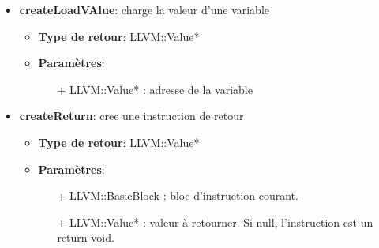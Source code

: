 \documentclass{article}
\begin{document}
\begin{enumerate}
\begin{itemize}
  \item \textbf{createLoadVAlue}: charge la valeur d'une variable
  \begin{itemize}
    \item \textbf{Type de retour}: LLVM::Value*
    \item \textbf{Paramètres}:
    \begin{enumerate}
      \item[+] LLVM::Value* : adresse de la variable
      \end{enumerate}
  \end{itemize}

  \item \textbf{createReturn}: cree une instruction de retour
  \begin{itemize}
    \item \textbf{Type de retour}: LLVM::Value*
    \item \textbf{Paramètres}:
    \begin{enumerate}
      \item[+] LLVM::BasicBlock : bloc d'instruction courant.
      \item[+] LLVM::Value* : valeur à retourner. Si null, l'instruction est un return void.
      \end{enumerate}
  \end{itemize}


  \end{itemize}


  \end{enumerate}
\end{document}
